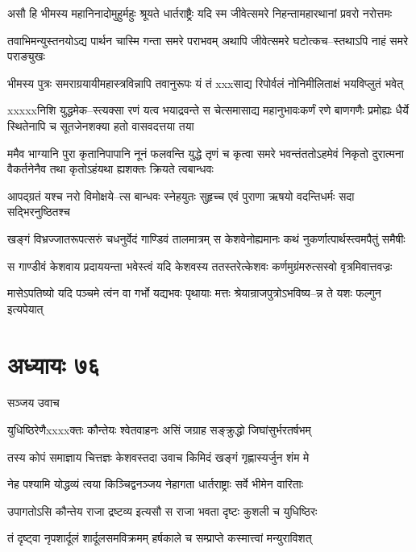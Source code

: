 \twolineshloka
{असौ हि भीमस्य महानिनादोमुहुर्महुः श्रूयते धार्तराष्ट्रैः}
{यदि स्म जीवेत्समरे निहन्तामहारथानां प्रवरो नरोत्तमः}


\twolineshloka
{तवाभिमन्युस्तनयोऽद्य पार्थन चास्मि गन्ता समरे पराभवम्}
{अथापि जीवेत्समरे घटोत्कच--स्तथाऽपि नाहं समरे पराङ्युखः}


\twolineshloka
{भीमस्य पुत्रः समराग्रयायीमहास्त्रविन्नापि तवानुरूपः}
{यं तं xxxसाद्य रिपोर्वलं नोनिमीलिताक्षं भयविप्लुतं भवेत्}


xxxxxनिशि युद्धमेक--स्त्यक्सा रणं यत्व भयाद्रवन्ते
\twolineshloka
{स चेत्समासाद्य महानुभावःकर्णं रणे बाणगणैः प्रमोह्यः}
{धैर्ये स्थितेनापि च सूतजेनशक्या हतो वासवदत्तया तया}


\threelineshloka
{ममैव भाग्यानि पुरा कृतानिपापानि नूनं फलवन्ति युद्धे}
{तृणं च कृत्वा समरे भवन्तंततोऽहमेवं निकृतो दुरात्मना}
{वैकर्तनेनैव तथा कृतोऽहंयथा ह्यशक्तः क्रियते त्वबान्धवः}


\twolineshloka
{आपद्ग्रतं यश्च नरो विमोक्षये--त्स बान्धवः स्नेहयुतः सुहृच्च}
{एवं पुराणा ऋषयो वदन्तिधर्मः सदा सद्भिरनुष्ठितश्च}


\twolineshloka
{खङ्गं विभ्रज्जातरूपत्सरुं चधनुर्वेदं गाण्डिवं तालमात्रम्}
{स केशवेनोह्यमानः कथं नुकर्णात्पार्थस्त्वमपैतुं समैषीः}


\twolineshloka
{स गाण्डीवं केशवाय प्रदाययन्ता भवेस्त्वं यदि केशवस्य}
{ततस्तरेत्केशवः कर्णमुग्रंमरुत्सस्वो वृत्रमिवात्तवज्रः}


\twolineshloka
{मासेऽपतिष्यो यदि पञ्चमे त्वंन वा गर्भो यद्यभवः पृथायाः}
{मत्तः श्रेयान्राजपुत्रोऽभविष्य--न्न ते यशः फल्गुन इत्यपेयात्}


\chapter{अध्यायः ७६}
\twolineshloka
{सञ्जय उवाच}
{}


\twolineshloka
{युधिष्ठिरेणैxxxxक्तः कौन्तेयः श्वेतवाहनः}
{असिं जग्राह सङ्क्रुद्धो जिघांसुर्भरतर्षभम्}


\twolineshloka
{तस्य कोपं समाज्ञाय चित्तज्ञः केशवस्तदा}
{उवाच किमिदं खङ्गं गृह्णास्यर्जुन शंम मे}


\twolineshloka
{नेह पश्यामि योद्धव्यं त्वया किञ्चिद्वनञ्जय}
{नेहागता धार्तराष्ट्राः सर्वे भीमेन वारिताः}


\twolineshloka
{उपागतोऽसि कौन्तेय राजा द्रष्टव्य इत्यसौ}
{स राजा भवता दृष्टः कुशली च युधिष्ठिरः}


\twolineshloka
{तं दृष्ट्वा नृपशार्दूलं शार्दूलसमविक्रमम्}
{हर्षकाले च सम्प्राप्ते कस्मात्त्वां मन्युराविशत्}



